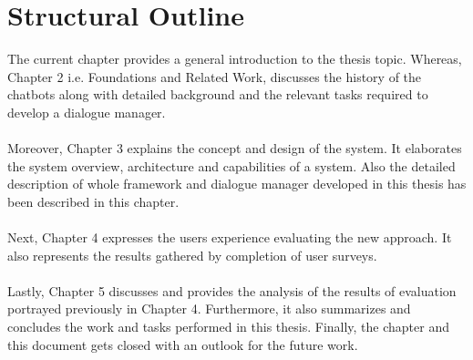 \section{Structural Outline}
The current chapter provides a general introduction to the thesis topic. Whereas, Chapter 2 i.e. Foundations and Related Work, discusses the history of the chatbots along with detailed background and the relevant tasks required to develop a dialogue manager.
\\~\\
Moreover, Chapter 3 explains the concept and design of the system. It elaborates the system overview, architecture and capabilities of a system. Also the detailed description of whole framework and dialogue manager developed in this thesis has been described in this chapter.
\\~\\
Next, Chapter 4 expresses the users experience evaluating the new approach. It also represents the results gathered by completion of user surveys.
\\~\\
Lastly, Chapter 5 discusses and provides the analysis of the results of evaluation portrayed previously in Chapter 4. Furthermore, it also summarizes and concludes the work and tasks performed in this thesis. Finally, the chapter and this document gets closed with an outlook for the future work.

